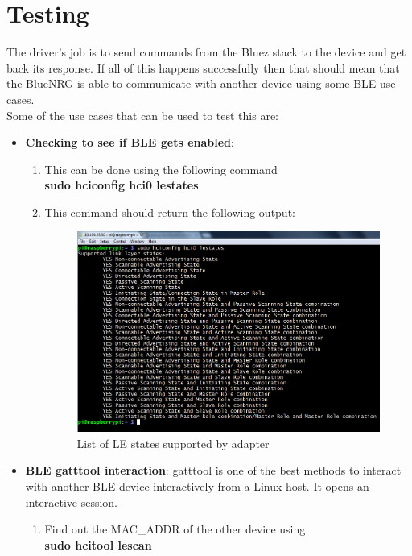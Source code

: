 \section{Testing}
The driver's job is to send commands from the Bluez stack to the device and get back its response. If all of this happens successfully then that should mean that the BlueNRG is able to communicate with another device using some BLE use cases.\\
Some of the use cases that can be used to test this are:
\begin{itemize}
	\item \textbf{Checking to see if BLE gets enabled}: 
		\begin{enumerate}
			\item This can be done using the following command\\
				\textbf{sudo hciconfig hci0 lestates}
			\item This command should return the following output:
				\begin{figure}[ht]
				\centering
				\includegraphics[scale=0.5]{images/lestates.png}
				\caption{List of LE states supported by adapter}
			\end{figure}
		\end{enumerate}
	\item \textbf{BLE gatttool interaction}: gatttool is one of the best methods to interact with another BLE device interactively from a Linux host. It opens an interactive session.
		\begin{enumerate}
			\item Find out the MAC\_ADDR of the other device using\\
				\textbf{sudo hcitool lescan}
				\begin{figure}[ht]

\end{figure}
\end{enumerate}
\end{itemize}
